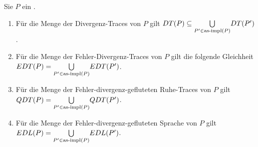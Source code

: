 \vspace{0.2cm}

\begin{Prop}
  Sie $P$ ein \MEIO{}.
  \begin{enumerate}
    \item Für die Menge der Divergenz-Traces von $P$ gilt $DT (P) \subseteq
      \underset{P'\in\mathrm{as}\text{-}\mathrm{impl} (P)}{\bigcup} DT (P')$.
    \item Für die Menge der Fehler-Divergenz-Traces von $P$ gilt die folgende
      Gleichheit $EDT (P) = \underset{P'\in\mathrm{as}\text{-}\mathrm{impl} (P)}{\bigcup} EDT (P')$.
    \item Für die Menge der Fehler-divergenz-gefluteten Ruhe-Traces von $P$
      gilt $QDT (P) = \underset{P'\in\mathrm{as}\text{-}\mathrm{impl} (P)}{\bigcup} QDT (P')$.
    \item Für die Menge der Fehler-divergenz-gefluteten Sprache von $P$ gilt
      $EDL (P) = \underset{P'\in\mathrm{as}\text{-}\mathrm{impl} (P)}{\bigcup} EDL (P')$.
  \end{enumerate}
\end{Prop}
